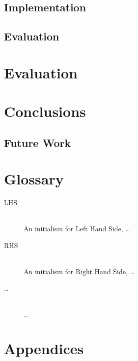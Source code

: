 \documentclass{UoYCSproject}
\begin{document}
\section{Implementation}
\section{Evaluation}

\chapter{Evaluation}
\chapter{Conclusions}
\section{Future Work}
\chapter{Glossary}
\begin{description}
  \item[LHS] \hfill \\
  An initialism for Left Hand Side, \ldots
  \item[RHS] \hfill \\
  An initialism for Right Hand Side, \ldots
  \item[\ldots] \hfill \\
  \ldots
\end{description}

% 

\chapter{Appendices}
\end{document}
